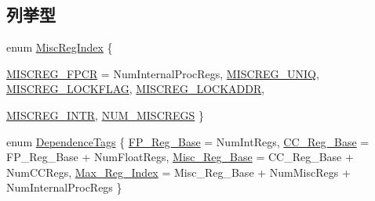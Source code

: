 \subsection*{列挙型}
\begin{DoxyCompactItemize}
\item 
enum \hyperlink{namespaceAlphaISA_a1e522017e015d4c7efd6b2360143aa67}{MiscRegIndex} \{ \par
\hyperlink{namespaceAlphaISA_a1e522017e015d4c7efd6b2360143aa67a015a601dd43bbdcfc4010fd4b4ab8489}{MISCREG\_\-FPCR} =  NumInternalProcRegs, 
\hyperlink{namespaceAlphaISA_a1e522017e015d4c7efd6b2360143aa67ac7d1563911c3c3cbd38713677fce2991}{MISCREG\_\-UNIQ}, 
\hyperlink{namespaceAlphaISA_a1e522017e015d4c7efd6b2360143aa67a96956bffd04139e669b2dbc923a11b23}{MISCREG\_\-LOCKFLAG}, 
\hyperlink{namespaceAlphaISA_a1e522017e015d4c7efd6b2360143aa67a05801eba9b0b664b274a2fd5d2611fea}{MISCREG\_\-LOCKADDR}, 
\par
\hyperlink{namespaceAlphaISA_a1e522017e015d4c7efd6b2360143aa67a31af5b9c5def1ac9d1b54f60f8e70442}{MISCREG\_\-INTR}, 
\hyperlink{namespaceAlphaISA_a1e522017e015d4c7efd6b2360143aa67a7d1d86545746c83e719e24556985648a}{NUM\_\-MISCREGS}
 \}
\item 
enum \hyperlink{namespaceAlphaISA_a4720195f4575f008ac78181d27db827e}{DependenceTags} \{ \hyperlink{namespaceAlphaISA_a4720195f4575f008ac78181d27db827ea23c089ac23981fe820094e2fc1579bf4}{FP\_\-Reg\_\-Base} =  NumIntRegs, 
\hyperlink{namespaceAlphaISA_a4720195f4575f008ac78181d27db827eae261857dbef59e0d93992a1e2d1fa322}{CC\_\-Reg\_\-Base} =  FP\_\-Reg\_\-Base + NumFloatRegs, 
\hyperlink{namespaceAlphaISA_a4720195f4575f008ac78181d27db827ea0cbf9912f8507e55495a158f1b94f803}{Misc\_\-Reg\_\-Base} =  CC\_\-Reg\_\-Base + NumCCRegs, 
\hyperlink{namespaceAlphaISA_a4720195f4575f008ac78181d27db827ea0693397933007a82bea39457bd7a7151}{Max\_\-Reg\_\-Index} =  Misc\_\-Reg\_\-Base + NumMiscRegs + NumInternalProcRegs
 \}
\end{DoxyCompactItemize}
